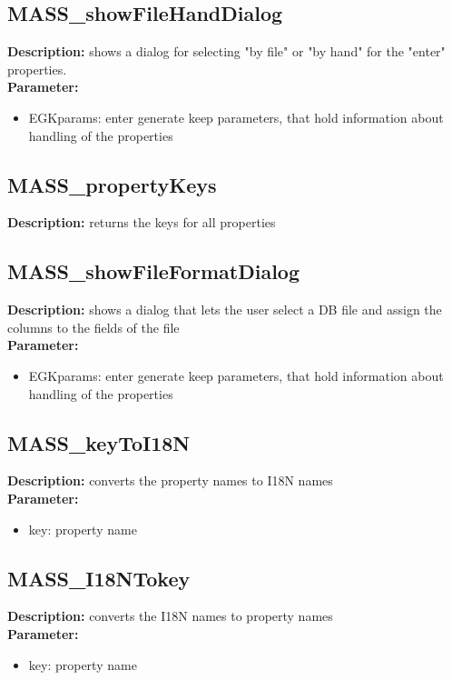 \subsection{MASS\_showFileHandDialog}
\textbf{Description:} shows a dialog for selecting "by file" or "by hand" for the "enter" properties.\\
\textbf{Parameter:}
\begin{itemize}
\item EGKparams: enter generate keep parameters, that hold information about handling of the properties
\end{itemize}

\subsection{MASS\_propertyKeys}
\textbf{Description:} returns the keys for all properties\\

\subsection{MASS\_showFileFormatDialog}
\textbf{Description:} shows a dialog that lets the user select a DB file and assign the columns to the fields of the file\\
\textbf{Parameter:}
\begin{itemize}
\item EGKparams: enter generate keep parameters, that hold information about handling of the properties
\end{itemize}

\subsection{MASS\_keyToI18N}
\textbf{Description:} converts the property names to I18N names\\
\textbf{Parameter:}
\begin{itemize}
\item key: property name
\end{itemize}

\subsection{MASS\_I18NTokey}
\textbf{Description:} converts the I18N names to property names\\
\textbf{Parameter:}
\begin{itemize}
\item key: property name
\end{itemize}

